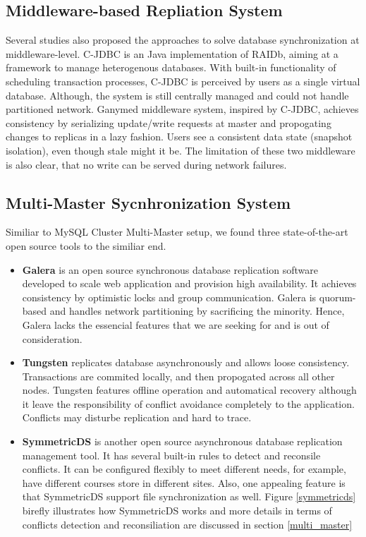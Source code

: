 \subsection{Middleware-based Repliation System}
Several studies also proposed the approaches to solve database synchronization at middleware-level\cite{cecchetc}\cite{amza2003conflict}\cite{plattner2004ganymed}. C-JDBC \cite{cecchetc} is an Java implementation of RAIDb\cite{cecchet2005raidb}, aiming at a framework to manage heterogenous databases. With built-in functionality of scheduling transaction processes, C-JDBC is perceived by users as a single virtual database. Although, the system is still centrally managed and could not handle partitioned network. Ganymed middleware system\cite{plattner2004ganymed}, inspired by C-JDBC, achieves consistency by serializing update/write requests at master and propogating changes to replicas in a lazy fashion. Users see a consistent data state (snapshot isolation), even though stale might it be. The limitation of these two middleware is also clear, that no write can be served during network failures.


\subsection{Multi-Master Sycnhronization System} 
Similiar to MySQL Cluster Multi-Master setup, we found three state-of-the-art open source tools to the similiar end.
\begin{itemize}
\item \textbf{Galera}\cite{galera} is an open source synchronous database replication software developed to scale web application and provision high availability. It achieves consistency by optimistic locks and group communication. Galera is quorum-based and handles network partitioning by sacrificing the minority. Hence, Galera lacks the essencial features that we are seeking for and is out of consideration.
\item \textbf{Tungsten}\cite{tungsten} replicates database asynchronously and allows loose consistency. Transactions are commited locally, and then propogated across all other nodes. Tungsten features offline operation and automatical recovery although it leave the responsibility of conflict avoidance completely to the application. Conflicts may disturbe replication and hard to trace.
\item \textbf{SymmetricDS}\cite{symmetricds} is another open source asynchronous database replication management tool. It has several built-in rules to detect and reconsile conflicts. It can be configured flexibly to meet different needs, for example, have different courses store in different sites. Also, one appealing feature is that SymmetricDS support file synchronization as well. Figure \ref{symmetricds} birefly illustrates how SymmetricDS works and more details in terms of conflicts detection and reconsiliation are discussed in section \ref{multi_master}
\end{itemize}

